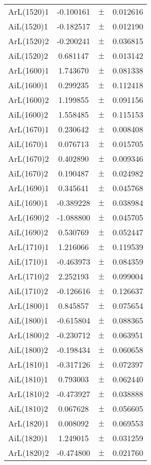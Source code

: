 \begin{table}
\begin{tiny}
\begin{tabular}{lccc}
ArL(1520)1 & -0.100161 & $\pm$ & 0.012616 \\
AiL(1520)1 & -0.182517 & $\pm$ & 0.012190 \\
ArL(1520)2 & -0.200241 & $\pm$ & 0.036815 \\
AiL(1520)2 & 0.681147 & $\pm$ & 0.013142 \\
ArL(1600)1 & 1.743670 & $\pm$ & 0.081338 \\
AiL(1600)1 & 0.299235 & $\pm$ & 0.112418 \\
ArL(1600)2 & 1.199855 & $\pm$ & 0.091156 \\
AiL(1600)2 & 1.558485 & $\pm$ & 0.115153 \\
ArL(1670)1 & 0.230642 & $\pm$ & 0.008408 \\
AiL(1670)1 & 0.076713 & $\pm$ & 0.015705 \\
ArL(1670)2 & 0.402890 & $\pm$ & 0.009346 \\
AiL(1670)2 & 0.190487 & $\pm$ & 0.024982 \\
ArL(1690)1 & 0.345641 & $\pm$ & 0.045768 \\
AiL(1690)1 & -0.389228 & $\pm$ & 0.038984 \\
ArL(1690)2 & -1.088800 & $\pm$ & 0.045705 \\
AiL(1690)2 & 0.530769 & $\pm$ & 0.052447 \\
ArL(1710)1 & 1.216066 & $\pm$ & 0.119539 \\
AiL(1710)1 & -0.463973 & $\pm$ & 0.084359 \\
ArL(1710)2 & 2.252193 & $\pm$ & 0.099004 \\
AiL(1710)2 & -0.126616 & $\pm$ & 0.126637 \\
ArL(1800)1 & 0.845857 & $\pm$ & 0.075654 \\
AiL(1800)1 & -0.615804 & $\pm$ & 0.088365 \\
ArL(1800)2 & -0.230712 & $\pm$ & 0.063951 \\
AiL(1800)2 & -0.198434 & $\pm$ & 0.060658 \\
ArL(1810)1 & -0.317126 & $\pm$ & 0.072397 \\
AiL(1810)1 & 0.793003 & $\pm$ & 0.062440 \\
ArL(1810)2 & -0.473927 & $\pm$ & 0.038888 \\
AiL(1810)2 & 0.067628 & $\pm$ & 0.056605 \\
ArL(1820)1 & 0.008092 & $\pm$ & 0.069553 \\
AiL(1820)1 & 1.249015 & $\pm$ & 0.031259 \\
ArL(1820)2 & -0.474800 & $\pm$ & 0.021760 \\

\end{tabular}
\end{tiny}
\end{table}
